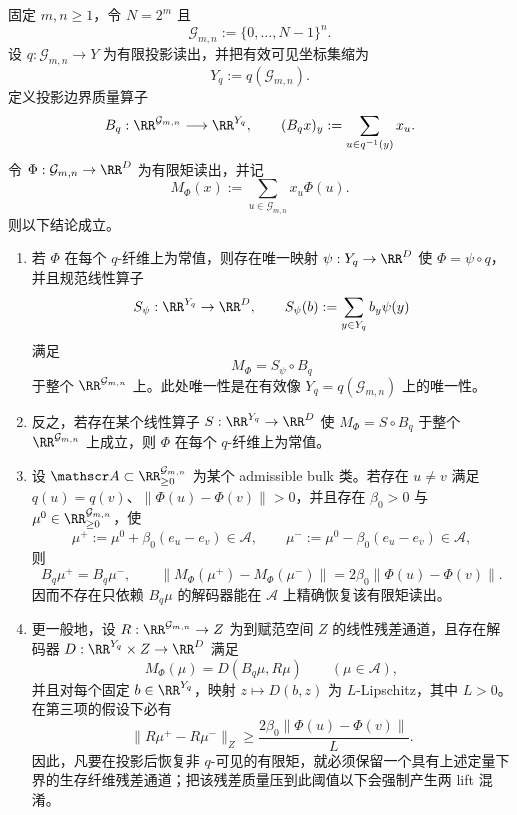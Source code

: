 \begin{theorem}[投影矩全息的生存纤维质量门]\label{distill:gromov-dimension_waist_projection_families-spg-finite-moment-surviving-fibre-mass-gate}
固定 \(m,n\ge1\)，令 \(N=2^m\) 且
\[
\mathcal G_{m,n}:=\{0,\ldots,N-1\}^n .
\]
设 \(q:\mathcal G_{m,n}\to Y\) 为有限投影读出，并把有效可见坐标集缩为
\[
Y_q:=q(\mathcal G_{m,n}).
\]
定义投影边界质量算子
\[
B_q:\RR^{\mathcal G_{m,n}}\longrightarrow \RR^{Y_q},\qquad
(B_qx)_y:=\sum_{u\in q^{-1}(y)}x_u .
\]
令 \(\Phi:\mathcal G_{m,n}\to\RR^D\) 为有限矩读出，并记
\[
M_\Phi(x):=\sum_{u\in\mathcal G_{m,n}}x_u\Phi(u).
\]
则以下结论成立。
\begin{enumerate}
  \item 若 \(\Phi\) 在每个 \(q\)-纤维上为常值，则存在唯一映射 \(\psi:Y_q\to\RR^D\) 使 \(\Phi=\psi\circ q\)，并且规范线性算子
  \[
  S_\psi:\RR^{Y_q}\to\RR^D,\qquad S_\psi(b):=\sum_{y\in Y_q}b_y\psi(y)
  \]
  满足
  \[
  M_\Phi=S_\psi\circ B_q
  \]
  于整个 \(\RR^{\mathcal G_{m,n}}\) 上。此处唯一性是在有效像 \(Y_q=q(\mathcal G_{m,n})\) 上的唯一性。
  \item 反之，若存在某个线性算子 \(S:\RR^{Y_q}\to\RR^D\) 使 \(M_\Phi=S\circ B_q\) 于整个 \(\RR^{\mathcal G_{m,n}}\) 上成立，则 \(\Phi\) 在每个 \(q\)-纤维上为常值。
  \item 设 \(\mathscr A\subset\RR_{\ge0}^{\mathcal G_{m,n}}\) 为某个 admissible bulk 类。若存在 \(u\ne v\) 满足 \(q(u)=q(v)\)、\(\|\Phi(u)-\Phi(v)\|>0\)，并且存在 \(\beta_0>0\) 与 \(\mu^0\in\RR_{\ge0}^{\mathcal G_{m,n}}\)，使
  \[
  \mu^+:=\mu^0+\beta_0(e_u-e_v)\in\mathscr A,\qquad
  \mu^-:=\mu^0-\beta_0(e_u-e_v)\in\mathscr A,
  \]
  则
  \[
  B_q\mu^+=B_q\mu^-,
  \qquad
  \|M_\Phi(\mu^+)-M_\Phi(\mu^-)\|=2\beta_0\|\Phi(u)-\Phi(v)\|.
  \]
  因而不存在只依赖 \(B_q\mu\) 的解码器能在 \(\mathscr A\) 上精确恢复该有限矩读出。
  \item 更一般地，设 \(R:\RR^{\mathcal G_{m,n}}\to Z\) 为到赋范空间 \(Z\) 的线性残差通道，且存在解码器 \(D:\RR^{Y_q}\times Z\to\RR^D\) 满足
  \[
  M_\Phi(\mu)=D(B_q\mu,R\mu)\qquad(\mu\in\mathscr A),
  \]
  并且对每个固定 \(b\in\RR^{Y_q}\)，映射 \(z\mapsto D(b,z)\) 为 \(L\)-Lipschitz，其中 \(L>0\)。在第三项的假设下必有
  \[
  \|R\mu^+-R\mu^-\|_Z
  \ge
  \frac{2\beta_0\|\Phi(u)-\Phi(v)\|}{L}.
  \]
  因此，凡要在投影后恢复非 \(q\)-可见的有限矩，就必须保留一个具有上述定量下界的生存纤维残差通道；把该残差质量压到此阈值以下会强制产生两 lift 混淆。
\end{enumerate}
\end{theorem}

